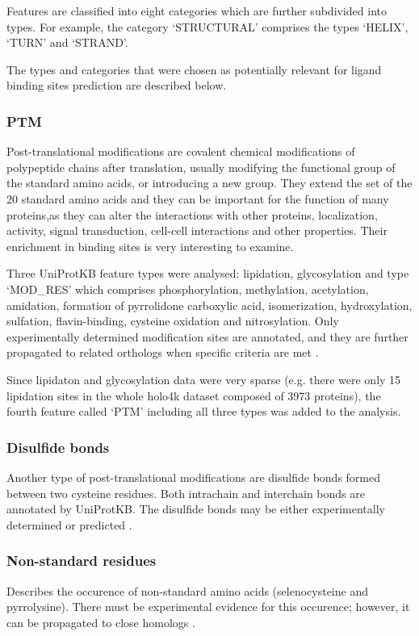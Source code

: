 Features are classified into eight categories which are further subdivided into types. For example, the category `STRUCTURAL' comprises the types `HELIX', `TURN' and `STRAND'.

The types and categories that were chosen as potentially relevant for ligand binding sites prediction are described below.


\subsubsection{PTM}
Post-translational modifications are covalent chemical modifications of polypeptide chains after translation, usually modifying the functional group of the standard amino acids, or introducing a new group. They extend the set of the 20 standard amino acids and they can be important for the function of many proteins,as they can alter the interactions with other proteins, localization, activity, signal transduction, cell-cell interactions and other properties. Their enrichment in binding sites is very interesting to examine.

Three UniProtKB feature types were analysed: lipidation, glycosylation and type `MOD\_RES' which comprises phosphorylation, methylation, acetylation, amidation, formation of pyrrolidone carboxylic acid, isomerization, hydroxylation, sulfation, flavin-binding, cysteine oxidation and nitrosylation. Only experimentally determined modification sites are annotated, and they are further propagated to related orthologs when specific criteria are met \cite{mod_res}.

Since lipidaton and glycosylation data were very sparse (e.g. there were only 15 lipidation sites in the whole holo4k dataset composed of 3973 proteins), the fourth feature called `PTM' including all three types was added to the analysis.

\subsubsection{Disulfide bonds}
Another type of post-translational modifications are disulfide bonds formed between two cysteine residues. Both intrachain and interchain bonds are annotated by \mbox{UniProtKB}. The disulfide bonds may be either experimentally determined or predicted \cite{disulfid}.

\subsubsection{Non-standard residues}
Describes the occurence of non-standard amino acids (selenocysteine and pyrrolysine). There must be experimental evidence for this occurence; however, it can be propagated to close homologs \cite{non_std}.

